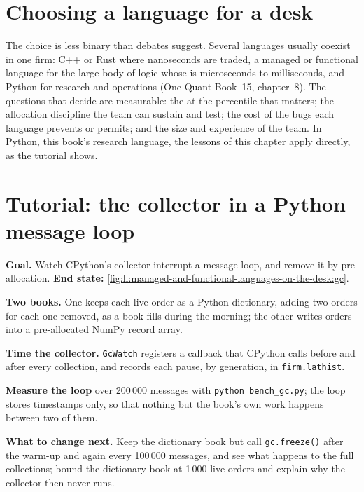 \section{Choosing a language for a desk}

The choice is less binary than debates suggest. Several languages usually coexist in one firm: C++ or Rust where
nanoseconds are traded, a managed or functional language for the large body of logic whose
 is microseconds to milliseconds, and Python for research and operations (One Quant Book~15, chapter~8). The
questions that decide are measurable: the  at the percentile that matters; the allocation discipline the
team can sustain and test; the cost of the bugs each language prevents or permits; and the size and experience of the
team. In Python, this book's research language, the lessons of this chapter apply directly, as the tutorial shows.

\section{Tutorial: the collector in a Python message loop}\label{tut:ll:managed-and-functional-languages-on-the-desk:tut}

\begin{tutorial}
\textbf{Goal.} Watch CPython's collector interrupt a message loop, and remove it by pre-allocation. \textbf{End state:}
\cref{fig:ll:managed-and-functional-languages-on-the-desk:gc}.
\begin{tutsteps}
\item \textbf{Two books.} One keeps each live order as a Python dictionary, adding two orders for each one removed, as a
book fills during the morning; the other writes orders into a pre-allocated NumPy record array.
\label{lst:ll:managed-and-functional-languages-on-the-desk:books}
\item \textbf{Time the collector.} \texttt{GcWatch} registers a callback that CPython calls before and after every
collection, and records each pause, by generation, in \texttt{firm.lathist}.
\label{lst:ll:managed-and-functional-languages-on-the-desk:watch}
\item \textbf{Measure the loop} over 200\,000 messages with \texttt{python bench\_gc.py}; the loop stores timestamps only,
so that nothing but the book's own work happens between two of them.
\end{tutsteps}
\textbf{What to change next.} Keep the dictionary book but call \texttt{gc.freeze()} after the warm-up and again every
100\,000 messages, and see what happens to the full collections; bound the dictionary book at 1\,000 live orders and
explain why the collector then never runs.
\end{tutorial}

